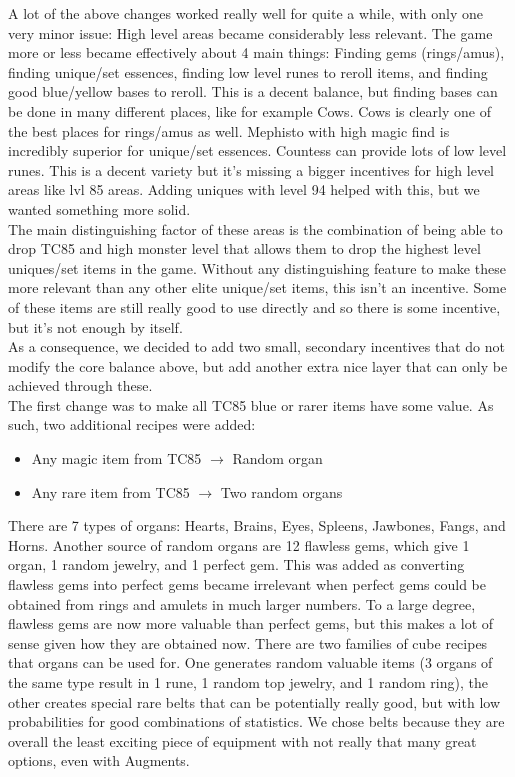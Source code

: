\documentclass[12pt,a4paper]{article}
\begin{document}
A lot of the above changes worked really well for quite a while, with only one very minor issue: High level areas became considerably less relevant. The game more or less became effectively about 4 main things: Finding gems (rings/amus), finding unique/set essences, finding low level runes to reroll items, and finding good blue/yellow bases to reroll. This is a decent balance, but finding bases can be done in many different places, like for example Cows. Cows is clearly one of the best places for rings/amus as well. Mephisto with high magic find is incredibly superior for unique/set essences. Countess can provide lots of low level runes. This is a decent variety but it's missing a bigger incentives for high level areas like lvl 85 areas. Adding uniques with level 94 helped with this, but we wanted something more solid.\\

The main distinguishing factor of these areas is the combination of being able to drop TC85 and high monster level that allows them to drop the highest level uniques/set items in the game. Without any distinguishing feature to make these more relevant than any other elite unique/set items, this isn't an incentive. Some of these items are still really good to use directly and so there is some incentive, but it's not enough by itself.\\

As a consequence, we decided to add two small, secondary incentives that do not modify the core balance above, but add another extra nice layer that can only be achieved through these.\\

The first change was to make all TC85 blue or rarer items have some value. As such, two additional recipes were added:

\begin{itemize}
\item Any magic item from TC85 $\rightarrow$ Random organ
\item Any rare item from TC85 $\rightarrow$ Two random organs
\end{itemize}

There are 7 types of organs: Hearts, Brains, Eyes, Spleens, Jawbones, Fangs, and Horns. Another source of random organs are 12 flawless gems, which give 1 organ, 1 random jewelry, and 1 perfect gem. This was added as converting flawless gems into perfect gems became irrelevant when perfect gems could be obtained from rings and amulets in much larger numbers. To a large degree, flawless gems are now more valuable than perfect gems, but this makes a lot of sense given how they are obtained now. There are two families of cube recipes that organs can be used for. One generates random valuable items (3 organs of the same type result in 1 rune, 1 random top jewelry, and 1 random ring), the other creates special rare belts that can be potentially really good, but with low probabilities for good combinations of statistics. We chose belts because they are overall the least exciting piece of equipment with not really that many great options, even with Augments.
\end{document}
